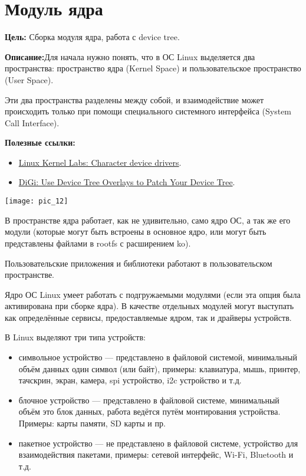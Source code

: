 \chapter{Модуль ядра}\label{lab:char_dev}
\textbf{Цель:} Сборка модуля ядра, работа с device tree.

\vspace{5mm}
\textbf{Описание:}Для начала нужно понять, что в ОС Linux выделяется два пространства: пространство ядра (Kernel Space) и пользовательское пространство (User Space).

Эти два пространства разделены между собой, и взаимодействие может происходить только при помощи специального системного интерфейса (System Call Interface).

\vspace{5mm}
\textbf{Полезные ссылки:}
\begin{itemize}
	\item \href{https://linux-kernel-labs.github.io/refs/heads/master/labs/device_drivers.html}{Linux Kernel Labs: Character device drivers}.
	\item \href{https://www.digi.com/resources/examples-guides/use-device-tree-overlays-to-patch-your-device-tree}{DiGi: Use Device Tree Overlays to Patch Your Device Tree}.
\end{itemize}


\begin{center}
	\texttt{[image: pic\_12]}
\end{center}

В пространстве ядра работает, как не удивительно, само ядро ОС, а так же его модули (которые могут быть встроены в основное ядро, или могут быть представлены файлами в rootfs с расширением ko).

Пользовательские приложения и библиотеки работают в пользовательском пространстве. 

Ядро ОС Linux умеет работать с подгружаемыми модулями (если эта опция была активирована при сборке ядра). В качестве отдельных модулей могут выступать как определённые сервисы, предоставляемые ядром, так и драйверы устройств.

В Linux выделяют три типа устройств:
\begin{itemize}
	\item символьное устройство — представлено в файловой системой, минимальный объём данных один символ (или байт), примеры: клавиатура, мышь, принтер, тачскрин, экран, камера, spi устройство, i2c устройство и т.д. 
	\item блочное устройство — представлено в файловой системе, минимальный объём это блок данных, работа ведётся путём монтирования устройства. Примеры: карты памяти, SD карты и пр.  
	\item пакетное устройство — не представлено в файловой системе, устройство для взаимодействия пакетами, примеры: сетевой интерфейс, Wi-Fi, Bluetooth и т.д. 
\end{itemize}

